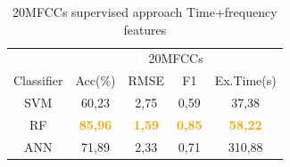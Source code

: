 \documentclass[conference]{IEEEtran}
\begin{document}
\begin{table}[!ht]
    \centering
    \caption{20MFCCs supervised approach Time+frequency features}
    \label{tab:20MFCCs Time+Frequency Features Table Results}
    \begin{tabular}{c c c c c}
    \toprule
    &\multicolumn{4}{c}{20MFCCs}\\
    \cmidrule{2-5}
        Classifier  &Acc(\%) &RMSE &F1 &Ex.Time(s)\\
    \midrule 
        SVM             &60,23 &2,75 &0,59 &37,38\\
        RF              &\textcolor{orange}{\textbf{85,96}}&\textcolor{orange}{\textbf{1,59}}
                        &\textcolor{orange}{\textbf{0,85}}&\textcolor{orange}{\textbf{58,22}}\\
        ANN             &71,89 &2,33 &0,71 &310,88\\
    \bottomrule
    \end{tabular}
\end{table}
\end{document}
